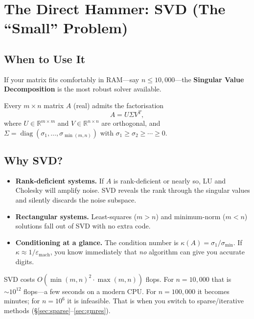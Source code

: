 \section{The Direct Hammer: SVD (The ``Small'' Problem)}
\label{sec:svd}

\subsection{When to Use It}

If your matrix fits comfortably in RAM---say $n \le 10{,}000$---the
\textbf{Singular Value Decomposition} is the most robust solver available.

Every $m \times n$ matrix $A$ (real) admits the factorisation
\[
    A = U \Sigma V^T,
\]
where $U \in \mathbb{R}^{m \times m}$ and $V \in \mathbb{R}^{n \times n}$
are orthogonal, and $\Sigma = \operatorname{diag}(\sigma_1, \dots,
\sigma_{\min(m,n)})$ with $\sigma_1 \ge \sigma_2 \ge \cdots \ge 0$.

\subsection{Why SVD?}

\begin{itemize}[nosep]
    \item \textbf{Rank-deficient systems.}  If $A$ is rank-deficient or
          nearly so, LU and Cholesky will amplify noise.  SVD reveals the
          rank through the singular values and silently discards the
          noise subspace.
    \item \textbf{Rectangular systems.}  Least-squares ($m > n$) and
          minimum-norm ($m < n$) solutions fall out of SVD with no extra
          code.
    \item \textbf{Conditioning at a glance.}  The condition number is
          $\kappa(A) = \sigma_1 / \sigma_{\min}$.  If $\kappa \approx
          1/\varepsilon_{\mathrm{mach}}$, you know immediately that
          \emph{no} algorithm can give you accurate digits.
\end{itemize}

\begin{tipbox}
SVD costs $O(\min(m,n)^2 \cdot \max(m,n))$ flops.  For $n = 10{,}000$
that is $\sim 10^{12}$ flops---a few seconds on a modern CPU.
For $n = 100{,}000$ it becomes minutes; for $n = 10^6$ it is
infeasible.  That is when you switch to sparse/iterative methods
(\S\ref{sec:sparse}--\ref{sec:gmres}).
\end{tipbox}

